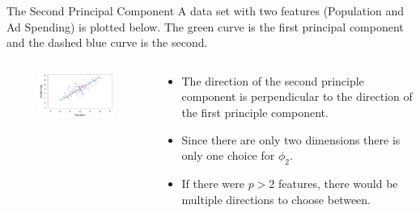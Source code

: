 \documentclass[
  ignorenonframetext,
  aspectratio=169,
]{beamer}
\begin{document}
\begin{frame}{The Second Principal Component}
\protect\hypertarget{the-second-principal-component-1}{}
A data set with two features (Population and Ad Spending) is plotted
below. The green curve is the first principal component and the dashed
blue curve is the second.

\begin{columns}[T]
\begin{column}{0.6\textwidth}
\begin{figure}

{\centering \includegraphics[width=3.33333in,height=\textheight]{images/first_component.png}

}

\end{figure}
\end{column}

\begin{column}{0.4\textwidth}
\begin{itemize}
\item
  The direction of the second principle component is perpendicular to
  the direction of the first principle component.
\item
  Since there are only two dimensions there is only one choice for
  \(\phi_2\).
\item
  If there were \(p > 2\) features, there would be multiple directions
  to choose between.
\end{itemize}
\end{column}
\end{columns}
\end{frame}
\end{document}
